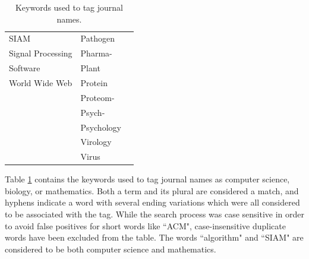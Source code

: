 \documentclass[12pt]{thesis}
\theoremstyle{plain}
\theoremstyle{definition}
\theoremstyle{remark}
\begin{document}
\begin{table}[h]
\begin{tabular}{| l | l | l |}
SIAM & Pathogen & \\
Signal Processing & Pharma- & \\
Software & Plant & \\
World Wide Web & Protein & \\
 & Proteom- & \\
 & Psych- & \\
 & Psychology & \\
 & Virology & \\
 & Virus & \\
\hline
\end{tabular}
\caption{Keywords used to tag journal names.}
\label{tab:tagging_keywords}
\end{table}

Table \ref{tab:tagging_keywords} contains the keywords used to tag journal names as computer science, biology, or mathematics. Both a term and its plural are considered a match, and hyphens indicate a word with several ending variations which were all considered to be associated with the tag. While the search process was case sensitive in order to avoid false positives for short words like ``ACM", case-insensitive duplicate words have been excluded from the table. The words ``algorithm" and ``SIAM" are considered to be both computer science and mathematics.




\printindex
\end{document}
